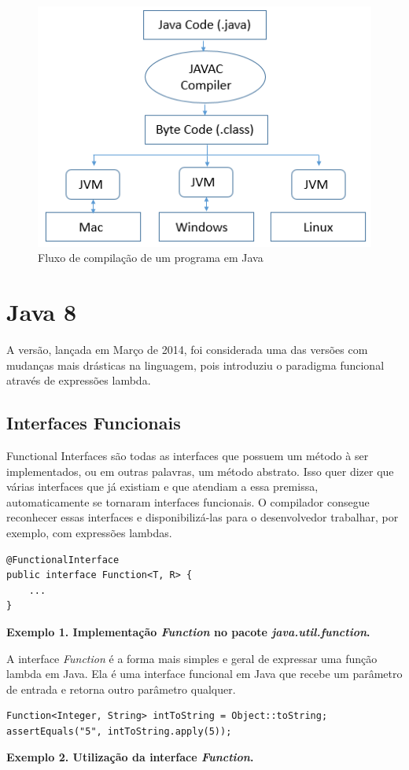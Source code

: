 \documentclass[12pt]{article}
\begin{document}
\begin{figure}[ht]
\centering
\includegraphics[width=.5\textwidth]{java-virtual-machine.png}
\caption{Fluxo de compilação de um programa em Java}
\label{fig:java-virtual-machine}
\end{figure}

\section{Java 8}

A versão, lançada em Março de 2014, foi considerada uma das versões com mudanças mais drásticas na linguagem, pois introduziu o paradigma funcional através de expressões lambda.

\subsection{Interfaces Funcionais}
\cite{functionalinterfaces} Functional Interfaces são todas as interfaces que possuem um método à ser implementados, ou em outras palavras, um método abstrato. Isso quer dizer que várias interfaces que já existiam e que atendiam a essa premissa, automaticamente se tornaram interfaces funcionais. O compilador consegue reconhecer essas interfaces e disponibilizá-las para o desenvolvedor trabalhar, por exemplo, com expressões lambdas.

\begin{verbatim}
@FunctionalInterface
public interface Function<T, R> {
    ...
}
\end{verbatim}
\centerline{\textbf{Exemplo 1. Implementação \textit{Function} no pacote \textit{java.util.function}.}}
\hfill \break

A interface \textit{Function} é a forma mais simples e geral de expressar uma função lambda em Java. Ela é uma interface funcional em Java que recebe um parâmetro de entrada e retorna outro parâmetro qualquer.

\begin{verbatim}
Function<Integer, String> intToString = Object::toString;
assertEquals("5", intToString.apply(5));

\end{verbatim}
\centerline{\textbf{Exemplo 2. Utilização da interface \textit{Function}.}}
\hfill \break
\end{document}
